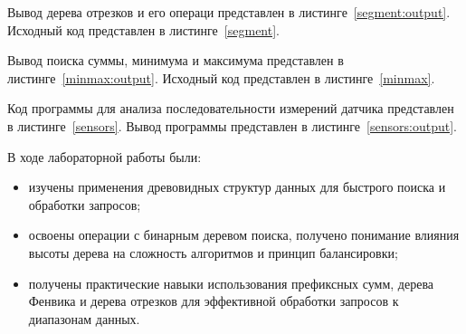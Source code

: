 



Вывод дерева отрезков и его операци представлен в листинге~\ref{segment:output}. 
Исходный код представлен в листинге~\ref{segment}.






Вывод поиска суммы, минимума и максимума представлен в листинге~\ref{minmax:output}. 
Исходный код представлен в листинге~\ref{minmax}.







Код программы для анализа последовательности измерений датчика представлен в листинге~\ref{sensors}. 
Вывод программы представлен в листинге~\ref{sensors:output}.







В ходе лабораторной работы были:
\begin{itemize}
	\item изучены применения древовидных структур данных для быстрого поиска и обработки запросов; 
	\item освоены операции с бинарным деревом поиска, получено понимание влияния высоты дерева на сложность алгоритмов и принцип балансировки; 
	\item получены практические навыки использования префиксных сумм, дерева Фенвика и дерева отрезков для эффективной обработки запросов к диапазонам данных.
\end{itemize}

